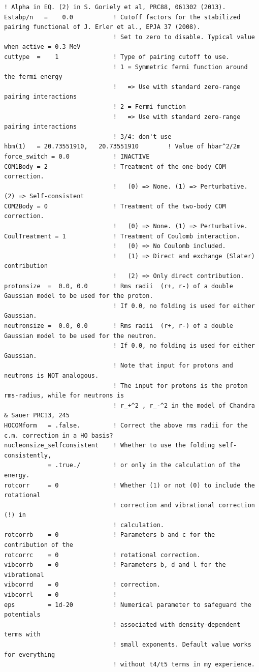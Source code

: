 \documentclass[print,amsmath,amssymb,aps,prc,nofootinbib,notitlepage]{revtex4-1}
\begin{document}
\begin{minipage}{.8\textwidth}
\begin{Verbatim}[fontsize=\footnotesize]
                              ! Alpha in EQ. (2) in S. Goriely et al, PRC88, 061302 (2013).
Estabp/n   =    0.0           ! Cutoff factors for the stabilized pairing functional of J. Erler et al., EPJA 37 (2008).
                              ! Set to zero to disable. Typical value when active = 0.3 MeV 
cuttype  =    1               ! Type of pairing cutoff to use. 
                              ! 1 = Symmetric fermi function around the fermi energy
                              !   => Use with standard zero-range pairing interactions
                              ! 2 = Fermi function                               
                              !   => Use with standard zero-range pairing interactions
                              ! 3/4: don't use 
hbm(1)   = 20.73551910,   20.73551910        ! Value of hbar^2/2m
force_switch = 0.0            ! INACTIVE
COM1Body = 2                  ! Treatment of the one-body COM correction.
                              !   (0) => None. (1) => Perturbative. (2) => Self-consistent
COM2Body = 0                  ! Treatment of the two-body COM correction.
                              !   (0) => None. (1) => Perturbative.
CoulTreatment = 1             ! Treatment of Coulomb interaction.
                              !   (0) => No Coulomb included.
                              !   (1) => Direct and exchange (Slater) contribution
                              !   (2) => Only direct contribution.
protonsize  =  0.0, 0.0       ! Rms radii  (r+, r-) of a double Gaussian model to be used for the proton.
                              ! If 0.0, no folding is used for either Gaussian.
neutronsize =  0.0, 0.0       ! Rms radii  (r+, r-) of a double Gaussian model to be used for the neutron.
                              ! If 0.0, no folding is used for either Gaussian.
                              ! Note that input for protons and neutrons is NOT analogous. 
                              ! The input for protons is the proton rms-radius, while for neutrons is 
                              ! r_+^2 , r_-^2 in the model of Chandra & Sauer PRC13, 245 
HOCOMform   = .false.         ! Correct the above rms radii for the c.m. correction in a HO basis?
nucleonsize_selfconsistent    ! Whether to use the folding self-consistently, 
            = .true./         ! or only in the calculation of the energy.
rotcorr     = 0               ! Whether (1) or not (0) to include the rotational 
                              ! correction and vibrational correction (!) in 
                              ! calculation.
rotcorrb    = 0               ! Parameters b and c for the contribution of the 
rotcorrc    = 0               ! rotational correction.
vibcorrb    = 0               ! Parameters b, d and l for the vibrational 
vibcorrd    = 0               ! correction.
vibcorrl    = 0               ! 
eps         = 1d-20           ! Numerical parameter to safeguard the potentials 
                              ! associated with density-dependent terms with 
                              ! small exponents. Default value works for everything
                              ! without t4/t5 terms in my experience. 
\end{Verbatim}
\end{minipage}
\end{document}
